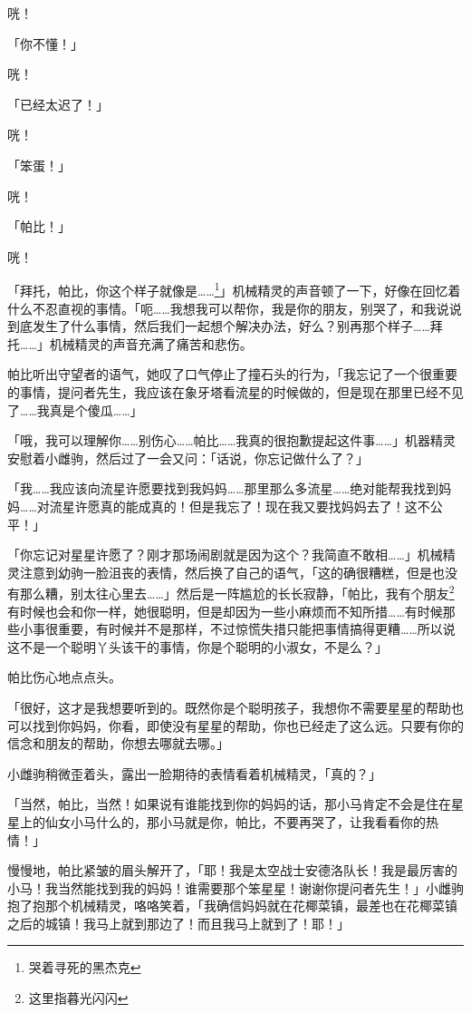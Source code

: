 咣！

「你不懂！」

咣！

「已经太迟了！」

咣！

「笨蛋！」

咣！

「帕比！」

咣！

「拜托，帕比，你这个样子就像是……{}\footnote{哭着寻死的黑杰克}」机械精灵的声音顿了一下，好像在回忆着什么不忍直视的事情。「呃……我想我可以帮你，我是你的朋友，别哭了，和我说说到底发生了什么事情，然后我们一起想个解决办法，好么？别再那个样子……拜托……」机械精灵的声音充满了痛苦和悲伤。

帕比听出守望者的语气，她叹了口气停止了撞石头的行为，「我忘记了一个很重要的事情，提问者先生，我应该在象牙塔看流星的时候做的，但是现在那里已经不见了……我真是个傻瓜……」

「哦，我可以理解你……别伤心……帕比……我真的很抱歉提起这件事……」机器精灵安慰着小雌驹，然后过了一会又问：「话说，你忘记做什么了？」

「我……我应该向流星许愿要找到我妈妈……那里那么多流星……绝对能帮我找到妈妈……对流星许愿真的能成真的！但是我忘了！现在我又要找妈妈去了！这不公平！」

「你忘记对星星许愿了？刚才那场闹剧就是因为这个？我简直不敢相……」机械精灵注意到幼驹一脸沮丧的表情，然后换了自己的语气，「这的确很糟糕，但是也没有那么糟，别太往心里去……」然后是一阵尴尬的长长寂静，「帕比，我有个朋友\footnote{这里指暮光闪闪}有时候也会和你一样，她很聪明，但是却因为一些小麻烦而不知所措……有时候那些小事很重要，有时候并不是那样，不过惊慌失措只能把事情搞得更糟……所以说这不是一个聪明丫头该干的事情，你是个聪明的小淑女，不是么？」

帕比伤心地点点头。

「很好，这才是我想要听到的。既然你是个聪明孩子，我想你不需要星星的帮助也可以找到你妈妈，你看，即使没有星星的帮助，你也已经走了这么远。只要有你的信念和朋友的帮助，你想去哪就去哪。」

小雌驹稍微歪着头，露出一脸期待的表情看着机械精灵，「真的？」

「当然，帕比，当然！如果说有谁能找到你的妈妈的话，那小马肯定不会是住在星星上的仙女小马什么的，那小马就是你，帕比，不要再哭了，让我看看你的热情！」

慢慢地，帕比紧皱的眉头解开了，「耶！我是太空战士安德洛队长！我是最厉害的小马！我当然能找到我的妈妈！谁需要那个笨星星！谢谢你提问者先生！」小雌驹抱了抱那个机械精灵，咯咯笑着，「我确信妈妈就在花椰菜镇，最差也在花椰菜镇之后的城镇！我马上就到那边了！而且我马上就到了！耶！」

